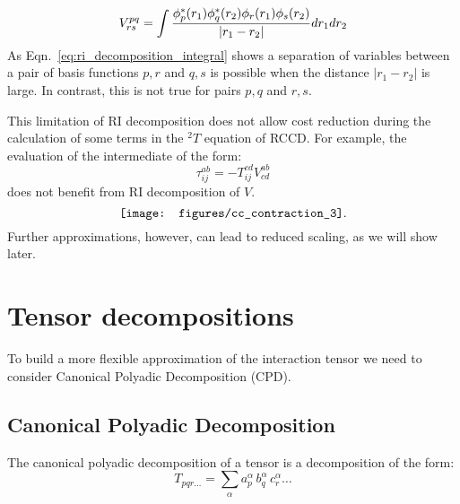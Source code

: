 \begin{equation}
 V^{pq}_{rs} = \int \frac{\phi^{\ast}_{p}(r_{1}) 
\phi^{\ast}_{q}(r_{2}) \phi_{r}(r_{1}) \phi_{s}(r_{2})}{| r_{1} - r_{2} |} 
dr_{1} dr_{2} \\ 
\label{eq:ri_decomposition_integral}
\end{equation}
As Eqn.~\ref{eq:ri_decomposition_integral} shows a separation of variables 
between a pair of basis functions $p, r$ and $q, s$ is possible when the 
distance $|r_{1} - r_{2}|$ is large. In contrast, this is not true for pairs 
$p, q$ and $r, s$.

This limitation of RI decomposition does not allow cost reduction during the 
calculation of some terms in the ${}^{2}T$ equation of RCCD. For example, the 
evaluation of the intermediate of the form:
\begin{equation}
 \tau^{ab}_{ij} = - T^{cd}_{ij}  V^{ab}_{cd}
\end{equation}
does not benefit from RI decomposition of $V$.
\begin{equation}
\vcenter{\hbox{\texttt{[image: figures/cc\_contraction\_3]}}}
.
\end{equation}
Further approximations, however, can lead to reduced scaling, as we will show 
later.

\section{Tensor decompositions}
To build a more flexible approximation of the interaction tensor we need to 
consider Canonical Polyadic Decomposition (CPD).
\subsection{Canonical Polyadic Decomposition}
The canonical polyadic decomposition of a tensor is a decomposition of the 
form:\cite{de2006link}
%
\begin{equation}
T_{pqr\ldots} = \sum_\alpha a_p^\alpha \, b_q^\alpha \,
c_r^\alpha \ldots
\label{eq:cpd_definition}
\end{equation}

